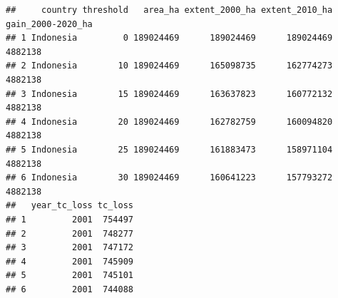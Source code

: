 \documentclass[
]{article}
\newenvironment{Shaded}{\begin{snugshade}}{\end{snugshade}}
\newcommand{\CommentTok}[1]{\textcolor[rgb]{0.56,0.35,0.01}{\textit{#1}}}
\newcommand{\FunctionTok}[1]{\textcolor[rgb]{0.13,0.29,0.53}{\textbf{#1}}}
\newcommand{\NormalTok}[1]{#1}
\newcommand{\OtherTok}[1]{\textcolor[rgb]{0.56,0.35,0.01}{#1}}
\newcommand{\SpecialCharTok}[1]{\textcolor[rgb]{0.81,0.36,0.00}{\textbf{#1}}}
\newcommand{\StringTok}[1]{\textcolor[rgb]{0.31,0.60,0.02}{#1}}
\begin{document}
\begin{Shaded}
\end{Shaded}

\begin{verbatim}
##     country threshold   area_ha extent_2000_ha extent_2010_ha gain_2000-2020_ha
## 1 Indonesia         0 189024469      189024469      189024469           4882138
## 2 Indonesia        10 189024469      165098735      162774273           4882138
## 3 Indonesia        15 189024469      163637823      160772132           4882138
## 4 Indonesia        20 189024469      162782759      160094820           4882138
## 5 Indonesia        25 189024469      161883473      158971104           4882138
## 6 Indonesia        30 189024469      160641223      157793272           4882138
##   year_tc_loss tc_loss
## 1         2001  754497
## 2         2001  748277
## 3         2001  747172
## 4         2001  745909
## 5         2001  745101
## 6         2001  744088
\end{verbatim}
\end{document}
